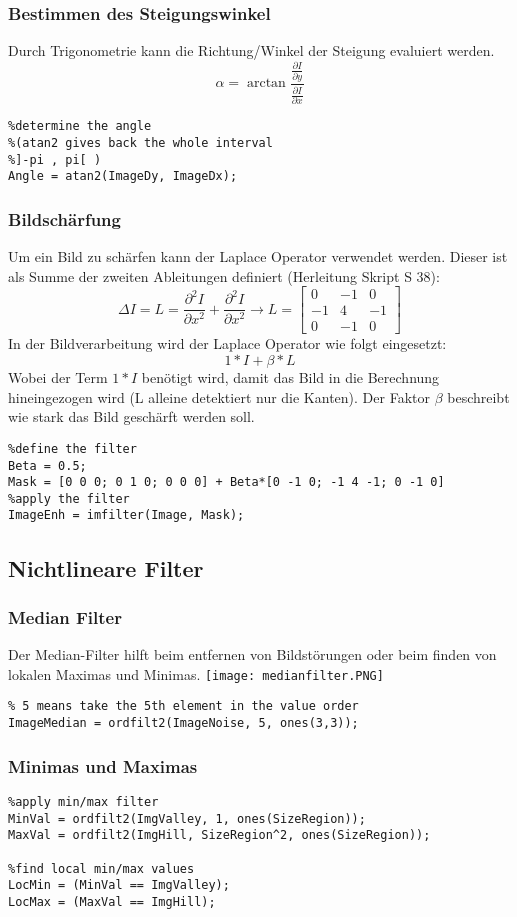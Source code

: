 \subsubsection{Bestimmen des Steigungswinkel}
Durch Trigonometrie kann die Richtung/Winkel der Steigung evaluiert werden.
\begin{equation}
\alpha = \arctan{\frac{\frac{\partial I}{\partial y}}{\frac{\partial I}{\partial x}}}
\end{equation}
\begin{lstlisting}
%determine the angle
%(atan2 gives back the whole interval
%]-pi , pi[ )
Angle = atan2(ImageDy, ImageDx);
\end{lstlisting}
\subsubsection{Bildschärfung}
Um ein Bild zu schärfen kann der Laplace Operator verwendet werden. Dieser ist als Summe der zweiten Ableitungen definiert (Herleitung Skript S 38):
\begin{equation}
\Delta I = L = \frac{\partial ^2I}{\partial x^2} + \frac{\partial ^2I}{\partial x^2} \to L = \begin{bmatrix}
0 & -1 & 0 \\
-1 & 4 & -1 \\
0 & -1 & 0
\end{bmatrix}
\end{equation}
In der Bildverarbeitung wird der Laplace Operator wie folgt eingesetzt:
\begin{equation}
1*I+\beta * L
\end{equation}
Wobei der Term $1*I$ benötigt wird, damit das Bild in die Berechnung hineingezogen wird (L alleine detektiert nur die Kanten). Der Faktor $\beta$ beschreibt wie stark das Bild geschärft werden soll.
\begin{lstlisting}
%define the filter
Beta = 0.5;
Mask = [0 0 0; 0 1 0; 0 0 0] + Beta*[0 -1 0; -1 4 -1; 0 -1 0]
%apply the filter
ImageEnh = imfilter(Image, Mask);
\end{lstlisting}

\subsection{Nichtlineare Filter}
\subsubsection{Median Filter}
Der Median-Filter hilft beim entfernen von Bildstörungen oder beim finden von lokalen Maximas und Minimas.
\texttt{[image: medianfilter.PNG]}
\begin{lstlisting}
% 5 means take the 5th element in the value order
ImageMedian = ordfilt2(ImageNoise, 5, ones(3,3));
\end{lstlisting}
\subsubsection{Minimas und Maximas}
\begin{lstlisting}
%apply min/max filter
MinVal = ordfilt2(ImgValley, 1, ones(SizeRegion));
MaxVal = ordfilt2(ImgHill, SizeRegion^2, ones(SizeRegion));

%find local min/max values
LocMin = (MinVal == ImgValley);
LocMax = (MaxVal == ImgHill);
\end{lstlisting}
